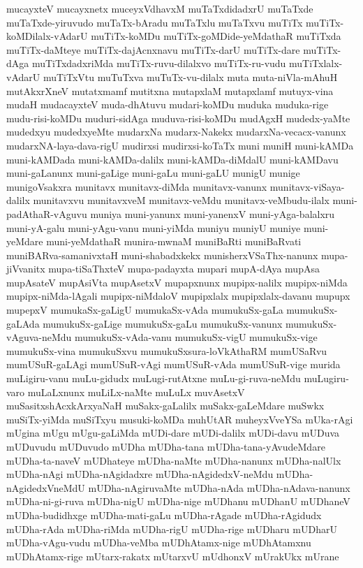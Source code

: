 {mucayxteV
mucayxnetx
muceyxVdhavxM
muTaTxdidadxrU
muTaTxde
muTaTxde-yiruvudo
muTaTx-bAradu
muTaTxlu
muTaTxvu
muTiTx
muTiTx-koMDilalx-vAdarU
muTiTx-koMDu
muTiTx-goMDide-yeMdathaR
muTiTxda
muTiTx-daMteye
muTiTx-dajAcnxnavu
muTiTx-darU
muTiTx-dare
muTiTx-dAga
muTiTxdadxriMda
muTiTx-ruvu-dilalxvo
muTiTx-ru-vudu
muTiTxlalx-vAdarU
muTiTxVtu
muTuTxva
muTuTx-vu-dilalx
muta
muta-niVla-mAhuH
mutAkxrXneV
mutatxmamf
mutitxna
mutapxlaM
mutapxlamf
mutuyx-vina
mudaH
mudacayxteV
muda-dhAtuvu
mudari-koMDu
muduka
muduka-rige
mudu-risi-koMDu
muduri-sidAga
muduva-risi-koMDu
mudAgxH
mudedx-yaMte
mudedxyu
mudedxyeMte
mudarxNa
mudarx-Nakekx
mudarxNa-vecacx-vanunx
mudarxNA-laya-dava-rigU
mudirxsi
mudirxsi-koTaTx
muni
muniH
muni-kAMDa
muni-kAMDada
muni-kAMDa-dalilx
muni-kAMDa-diMdalU
muni-kAMDavu
muni-gaLanunx
muni-gaLige
muni-gaLu
muni-gaLU
munigU
munige
munigoVsakxra
munitavx
munitavx-diMda
munitavx-vanunx
munitavx-viSaya-dalilx
munitavxvu
munitavxveM
munitavx-veMdu
munitavx-veMbudu-ilalx
muni-padAthaR-vAguvu
muniya
muni-yanunx
muni-yanenxV
muni-yAga-balalxru
muni-yA-galu
muni-yAgu-vanu
muni-yiMda
muniyu
muniyU
muniye
muni-yeMdare
muni-yeMdathaR
munira-mwnaM
muniBaRti
muniBaRvati
muniBARva-samanivxtaH
muni-shabadxkekx
munisherxVSaThx-nanunx
mupa-jiVvanitx
mupa-tiSaThxteV
mupa-padayxta
mupari
mupA-dAya
mupAsa
mupAsateV
mupAsiVta
mupAsetxV
mupapxnunx
mupipx-nalilx
mupipx-niMda
mupipx-niMda-lAgali
mupipx-niMdaloV
mupipxlalx
mupipxlalx-davanu
mupupx
mupepxV
mumukaSx-gaLigU
mumukaSx-vAda
mumukuSx-gaLa
mumukuSx-gaLAda
mumukuSx-gaLige
mumukuSx-gaLu
mumukuSx-vanunx
mumukuSx-vAguva-neMdu
mumukuSx-vAda-vanu
mumukuSx-vigU
mumukuSx-vige
mumukuSx-vina
mumukuSxvu
mumukuSxsura-loVkAthaRM
mumUSaRvu
mumUSuR-gaLAgi
mumUSuR-vAgi
mumUSuR-vAda
mumUSuR-vige
murida
muLigiru-vanu
muLu-gidudx
muLugi-rutAtxne
muLu-gi-ruva-neMdu
muLugiru-varo
muLaLxnunx
muLiLx-naMte
muLuLx
muvAsetxV
muSasitxshAcxkArxyaNaH
muSakx-gaLalilx
muSakx-gaLeMdare
muSwkx
muSiTx-yiMda
muSiTxyu
musuki-koMDa
muhUtAR
muheyxVveYSa
mUka-rAgi
mUgina
mUgu
mUgu-gaLiMda
mUDi-dare
mUDi-dalilx
mUDi-davu
mUDuva
mUDuvudu
mUDuvudo
mUDha
mUDha-tana
mUDha-tana-yAvudeMdare
mUDha-ta-naveV
mUDhateye
mUDha-naMte
mUDha-nanunx
mUDha-nalUlx
mUDha-nAgi
mUDha-nAgidadxre
mUDha-nAgidedxV-neMdu
mUDha-nAgidedxVneMdU
mUDha-nAgiruvaMte
mUDha-nAda
mUDha-nAdava-nanunx
mUDha-ni-gi-ruva
mUDha-nigU
mUDha-nige
mUDhanu
mUDhanU
mUDhaneV
mUDha-budidhxge
mUDha-mati-gaLu
mUDha-rAgade
mUDha-rAgidudx
mUDha-rAda
mUDha-riMda
mUDha-rigU
mUDha-rige
mUDharu
mUDharU
mUDha-vAgu-vudu
mUDha-veMba
mUDhAtamx-nige
mUDhAtamxnu
mUDhAtamx-rige
mUtarx-rakatx
mUtarxvU
mUdhonxV
mUrakUkx
mUrane
}
